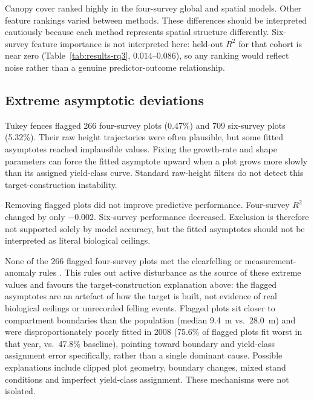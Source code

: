 Canopy cover ranked highly in the four-survey global and spatial models. Other feature rankings
varied between methods. These differences should be interpreted cautiously because each method
represents spatial structure differently. Six-survey feature importance is not interpreted here:
held-out $R^2$ for that cohort is near zero (Table~\ref{tab:results-rq3}, $0.014$--$0.086$), so any
ranking would reflect noise rather than a genuine predictor-outcome relationship.


\subsection{Extreme asymptotic deviations}

Tukey fences flagged 266 four-survey plots (0.47\%) and 709 six-survey plots (5.32\%). Their raw
height trajectories were often plausible, but some fitted asymptotes reached implausible values.
Fixing the growth-rate and shape parameters can force the fitted asymptote upward when a plot grows
more slowly than its assigned yield-class curve. Standard raw-height filters do not detect this
target-construction instability.

Removing flagged plots did not improve predictive performance. Four-survey $R^2$ changed by only
$-0.002$. Six-survey performance decreased. Exclusion is therefore not supported solely by model
accuracy, but the fitted asymptotes should not be interpreted as literal biological ceilings.

None of the 266 flagged four-survey plots met the clearfelling or measurement-anomaly rules
. This rules out active disturbance as the source of these extreme values and
favours the target-construction explanation above: the flagged asymptotes are an artefact of how
the target is built, not evidence of real biological ceilings or unrecorded felling events.
Flagged plots sit closer to compartment boundaries than the population (median 9.4~m vs.\ 28.0~m)
and were disproportionately poorly fitted in 2008 (75.6\% of flagged plots fit worst in that year,
vs.\ 47.8\% baseline), pointing toward boundary and yield-class assignment error specifically,
rather than a single dominant cause. Possible explanations include clipped plot geometry, boundary
changes, mixed stand conditions and imperfect yield-class assignment. These mechanisms were not
isolated.

